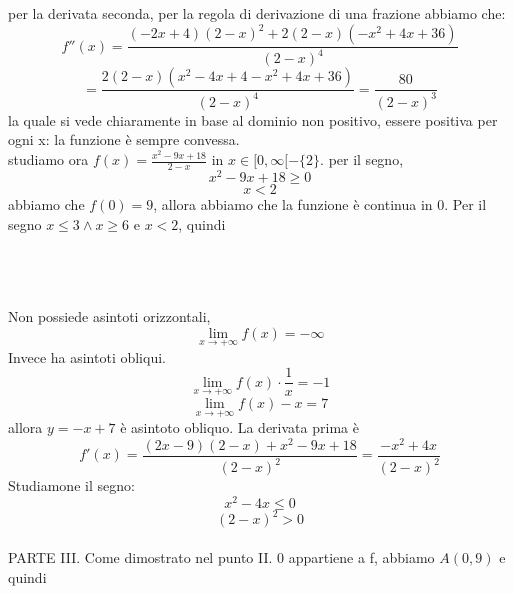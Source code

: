 \documentclass{article}
\begin{document}
per la derivata seconda, per la regola di derivazione di una frazione abbiamo che:
\[
f''(x) = \frac{(-2x+4)(2-x)^2+2(2-x)(-x^2+4x+36)}{(2-x)^4} 
\]
\[
= \frac{2(2-x)(x^2-4x+4-x^2+4x+36)}{(2-x)^4}
= \frac{80}{(2-x)^3}
\]
la quale si vede chiaramente in base al dominio non positivo, essere positiva per ogni x: la funzione è sempre convessa.\\
studiamo ora $f(x) = \frac{x^2 - 9x + 18}{2-x}$ in $x \in [0, \infty[ - \{2\}$.
per il segno,
\[
x^2-9x+18 \geq 0
\]
\[
x < 2
\]
abbiamo che $f(0) = 9$, allora abbiamo che la funzione è continua in 0. Per il segno 
$x \leq 3 \land x \geq 6 $ e $x < 2$, quindi
\\\\
\\\\
Non possiede asintoti orizzontali,
\[
\lim_{x \to +\infty} f(x) = -\infty
\]
Invece ha asintoti obliqui.
\[
\lim_{x \to +\infty} f(x) \cdot \frac{1}{x} = -1
\]
\[
\lim_{x \to +\infty} f(x) -x =  7
\]
allora $y = -x + 7$ è asintoto obliquo. La derivata prima è\\
\[f'(x) = \frac{(2x-9)(2-x) + x^2 -9x + 18}{(2-x)^2} = \frac{-x^2 + 4x}{(2-x)^2}
\]
Studiamone il segno:
\[
x^2 - 4x \leq 0
\]
\[
(2-x)^2 > 0
\]
\\

PARTE III.
Come dimostrato nel punto II. 0 appartiene a f, abbiamo $A(0,9)$ e quindi
\end{document}
